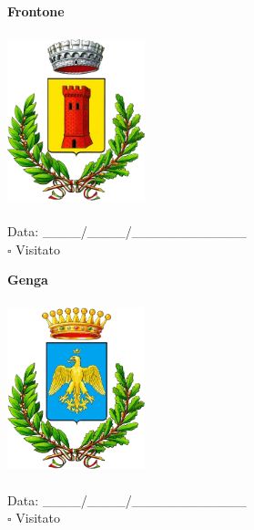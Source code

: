 \documentclass[a5paper,12pt]{article}
\begin{document}
\newpage

\noindent
\begin{minipage}[t]{0.45\textwidth}
    \begin{center}
        \textbf{Frontone}
    \end{center}
    \vspace{-0.5cm} %
    \begin{center}
        \includegraphics[height= 5cm, width=4cm]{Marche/Stemma Frontone.png}
    \end{center}
    \vspace{-0.4cm} %
    \begin{flushleft}
        Data: \_\_\_\_/\_\_\_\_/\_\_\_\_\_\_\_\_\_\_\_\_ \\
        $\square$ Visitato
    \end{flushleft}
\end{minipage}
\hfill
\noindent
\begin{minipage}[t]{0.45\textwidth}
    \begin{center}
        \textbf{Genga}
    \end{center}
    \vspace{-0.5cm} %
    \begin{center}
        \includegraphics[height= 5cm, width=4cm]{Marche/Stemma Genga.png}
    \end{center}
    \vspace{-0.4cm} %
    \begin{flushleft}
        Data: \_\_\_\_/\_\_\_\_/\_\_\_\_\_\_\_\_\_\_\_\_ \\
        $\square$ Visitato
    \end{flushleft}
\end{minipage}
\end{document}
